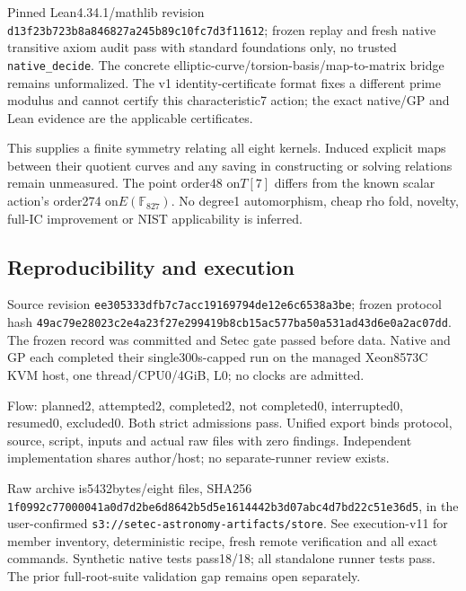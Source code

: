 \documentclass[
  10pt,
]{article}
\begin{document}
Pinned Lean4.34.1/mathlib revision
\texttt{d13f23b7\allowbreak{}23b8a846\allowbreak{}827a245b\allowbreak{}89c10fc7\allowbreak{}d3f11612}; frozen replay and
fresh native transitive axiom audit pass with standard foundations only,
no trusted \texttt{native\_decide}. The concrete
elliptic-curve/torsion-basis/map-to-matrix bridge remains unformalized.
The v1 identity-certificate format fixes a different prime modulus and
cannot certify this characteristic7 action; the exact native/GP and Lean
evidence are the applicable certificates.

This supplies a finite symmetry relating all eight kernels. Induced
explicit maps between their quotient curves and any saving in
constructing or solving relations remain unmeasured. The point order48
on\(T[7]\) differs from the known scalar action's order274
on\(E(\mathbb F_{827})\). No degree1 automorphism, cheap rho fold,
novelty, full-IC improvement or NIST applicability is inferred.

\subsection{Reproducibility and
execution}\label{reproducibility-and-execution}

Source revision \texttt{ee305333\allowbreak{}dfb7c7ac\allowbreak{}c1916979\allowbreak{}4de12e6c\allowbreak{}6538a3be};
frozen protocol hash
\texttt{49ac79e2\allowbreak{}8023c2e4\allowbreak{}a23f27e2\allowbreak{}99419b8c\allowbreak{}b15ac577\allowbreak{}ba50a531\allowbreak{}ad43d6e0\allowbreak{}a2ac07dd}.
The frozen record was committed and Setec gate passed before data.
Native and GP each completed their single300s-capped run on the managed
Xeon8573C KVM host, one thread/CPU0/4GiB, L0; no clocks are admitted.

Flow: planned2, attempted2, completed2, not completed0, interrupted0,
resumed0, excluded0. Both strict admissions pass. Unified export binds
protocol, source, script, inputs and actual raw files with zero
findings. Independent implementation shares author/host; no
separate-runner review exists.

Raw archive is5432bytes/eight files, SHA256
\texttt{1f0992c7\allowbreak{}7000041a\allowbreak{}0d7d2be6\allowbreak{}d8642b5d\allowbreak{}5e161444\allowbreak{}2b3d07ab\allowbreak{}c4d7bd22\allowbreak{}c51e36d5},
in the user-confirmed \texttt{s3://setec-astronomy-artifacts/store}. See
execution-v11 for member inventory, deterministic recipe, fresh remote
verification and all exact commands. Synthetic native tests pass18/18;
all standalone runner tests pass. The prior full-root-suite validation
gap remains open separately.
\end{document}
